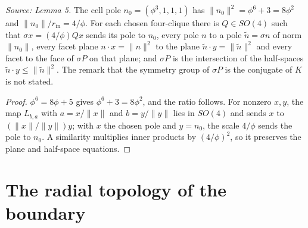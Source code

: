 \begin{theorem}
  \label{thm:cell-pole}
  \leanok
  \textit{Source: Lemma 5.}
  The cell pole \(n_0=(\phi^3,1,1,1)\) has
  \(\|n_0\|^2=\phi^6+3=8\phi^2\) and \(\|n_0\|/r_{\mathrm{in}}=4/\phi\). For
  each chosen four-clique there is \(Q\in SO(4)\) such that
  \(\sigma x=(4/\phi)Qx\) sends its pole to \(n_0\), every pole \(n\) to a
  pole \(\tilde n=\sigma n\) of norm \(\|n_0\|\), every facet plane
  \(n\cdot x=\|n\|^2\) to the plane \(\tilde n\cdot y=\|\tilde n\|^2\) and
  every facet to the face of \(\sigma P\) on that plane; and \(\sigma P\)
  is the intersection of the half-spaces
  \(\tilde n\cdot y\le\|\tilde n\|^2\). The remark that the symmetry group
  of \(\sigma P\) is the conjugate of \(K\) is not stated.
\end{theorem}
\begin{proof}
  \leanok
  \(\phi^6=8\phi+5\) gives \(\phi^6+3=8\phi^2\), and the ratio follows.
  For nonzero \(x,y\), the map \(L_{b,a}\) with \(a=x/\|x\|\) and
  \(b=y/\|y\|\) lies in \(SO(4)\) and sends \(x\) to \((\|x\|/\|y\|)y\);
  with \(x\) the chosen pole and \(y=n_0\), the scale \(4/\phi\) sends the
  pole to \(n_0\). A similarity multiplies inner products by
  \((4/\phi)^2\), so it preserves the plane and half-space equations.
\end{proof}

\section{The radial topology of the boundary}

